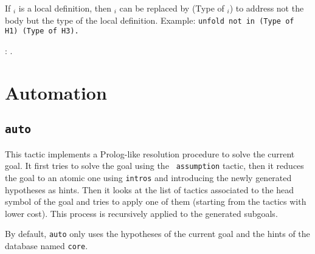 \begin{coq_example*}
If \ident$_i$ is a local definition, then \ident$_i$ can be replaced
by (Type of \ident$_i$) to address not the body but the type of the
local definition. Example: {\tt unfold not in (Type of H1) (Type of H3).}

\begin{ErrMsgs}
\item {} : {\ident}.
\end{ErrMsgs}


\section{Automation}
\subsection{\tt auto}
\label{auto}

This tactic implements a Prolog-like resolution procedure to solve the
current goal. It first tries to solve the goal using the {\tt
  assumption} tactic, then it reduces the goal to an atomic one using
{\tt intros} and introducing the newly generated hypotheses as hints.
Then it looks at the list of tactics associated to the head symbol of
the goal and tries to apply one of them (starting from the tactics
with lower cost). This process is recursively applied to the generated
subgoals.

By default, \texttt{auto} only uses the hypotheses of the current goal and the
hints of the database named {\tt core}.

\end{coq_example*}
